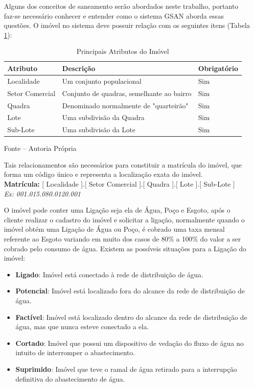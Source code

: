 Alguns dos conceitos de saneamento serão abordados neste trabalho, portanto faz-se necessário conhecer e entender como o sistema GSAN aborda essas questões.
O imóvel no sistema deve possuir relação com os seguintes itens (Tabela \ref{tabela:atributosImovel}):


\begin{table}[H]
	\center
	\footnotesize
	\begin{tabular}{|p{3cm}|p{7cm}|p{2.5cm}|} \hline
		\textbf{Atributo} 	& \textbf{Descrição}						& \textbf{Obrigatório}  \\ \hline
		Localidade 			& Um conjunto populacional					& Sim \\	\hline
		Setor Comercial 	& Conjunto de quadras, semelhante ao bairro & Sim \\ \hline
		Quadra 				& Denominado normalmente de "quarteirão" 	& Sim \\ \hline			
		Lote 				&  Uma subdivisão da Quadra 				& Sim \\ \hline
		Sub-Lote 			&  Uma subdivisão da Lote 					& Sim \\ \hline
	\end{tabular}
\caption{Principais Atributos do Imóvel}
\label{tabela:atributosImovel}
Fonte – Autoria Própria
\end{table}


Tais relacionamentos são necessários para constituir a matrícula do imóvel, que forma um código único e representa a localização exata do imóvel.\\
\textbf{Matrícula:} [ Localidade ].[ Setor Comercial ].[ Quadra ].[ Lote ].[ Sub-Lote ]  \\
\textit{Ex: 001.015.080.0120.001}

O imóvel pode conter uma Ligação seja ela de Água, Poço e Esgoto, após o cliente realizar o cadastro do imóvel e solicitar a ligação, normalmente quando o imóvel obtém uma Ligação de Água ou Poço, é cobrado uma taxa mensal referente ao Esgoto variando em muito dos casos de 80\% a 100\% do valor a ser cobrado pelo consumo de água. Existem as possíveis situações para a Ligação do imóvel:

\begin{itemize}
	\item \textbf{Ligado}: Imóvel está conectado à rede de distribuição de água.
	\item \textbf{Potencial}: Imóvel está localizado fora do alcance da rede de distribuição de água.
	\item \textbf{Factível}: Imóvel está localizado dentro do alcance da rede de distribuição de água, mas que nunca esteve conectado a ela.
	\item \textbf{Cortado}: Imóvel que possui um dispositivo de vedação do fluxo de água no intuito de interromper o abastecimento.
	\item \textbf{Suprimido}: Imóvel que teve o ramal de água retirado para a interrupção definitiva do abastecimento de água.	
\end{itemize}

